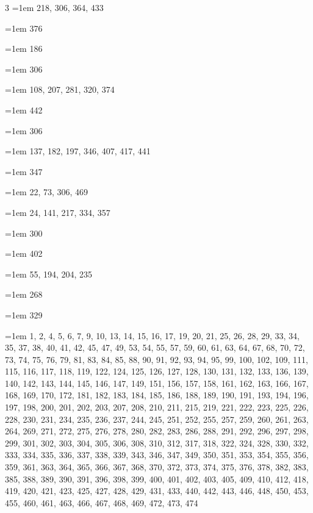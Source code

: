 \begin{multicols}{3}
\hangindent=1em  218, 306, 364, 433\par
\hangindent=1em  376\par
\hangindent=1em  186\par
\hangindent=1em  306\par
\hangindent=1em  108, 207, 281, 320, 374\par
\hangindent=1em  442\par
\hangindent=1em  306\par
\hangindent=1em  137, 182, 197, 346, 407, 417, 441\par
\hangindent=1em  347\par
\hangindent=1em  22, 73, 306, 469\par
\hangindent=1em  24, 141, 217, 334, 357\par
\hangindent=1em  300\par
\hangindent=1em  402\par
\hangindent=1em  55, 194, 204, 235\par
\hangindent=1em  268\par
\hangindent=1em  329\par
\hangindent=1em  1, 2, 4, 5, 6, 7, 9, 10, 13, 14, 15, 16, 17, 19, 20, 21, 25, 26, 28, 29, 33, 34, 35, 37, 38, 40, 41, 42, 45, 47, 49, 53, 54, 55, 57, 59, 60, 61, 63, 64, 67, 68, 70, 72, 73, 74, 75, 76, 79, 81, 83, 84, 85, 88, 90, 91, 92, 93, 94, 95, 99, 100, 102, 109, 111, 115, 116, 117, 118, 119, 122, 124, 125, 126, 127, 128, 130, 131, 132, 133, 136, 139, 140, 142, 143, 144, 145, 146, 147, 149, 151, 156, 157, 158, 161, 162, 163, 166, 167, 168, 169, 170, 172, 181, 182, 183, 184, 185, 186, 188, 189, 190, 191, 193, 194, 196, 197, 198, 200, 201, 202, 203, 207, 208, 210, 211, 215, 219, 221, 222, 223, 225, 226, 228, 230, 231, 234, 235, 236, 237, 244, 245, 251, 252, 255, 257, 259, 260, 261, 263, 264, 269, 271, 272, 275, 276, 278, 280, 282, 283, 286, 288, 291, 292, 296, 297, 298, 299, 301, 302, 303, 304, 305, 306, 308, 310, 312, 317, 318, 322, 324, 328, 330, 332, 333, 334, 335, 336, 337, 338, 339, 343, 346, 347, 349, 350, 351, 353, 354, 355, 356, 359, 361, 363, 364, 365, 366, 367, 368, 370, 372, 373, 374, 375, 376, 378, 382, 383, 385, 388, 389, 390, 391, 396, 398, 399, 400, 401, 402, 403, 405, 409, 410, 412, 418, 419, 420, 421, 423, 425, 427, 428, 429, 431, 433, 440, 442, 443, 446, 448, 450, 453, 455, 460, 461, 463, 466, 467, 468, 469, 472, 473, 474\par

\end{multicols}
